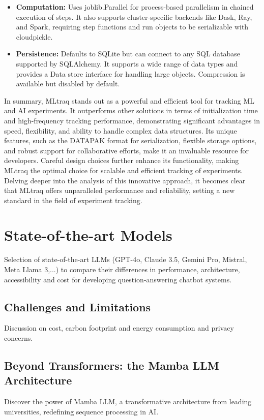 \begin{itemize}
    \item \textbf{Computation:} Uses joblib.Parallel for process-based parallelism in chained execution of steps. It also supports cluster-specific backends like Dask, Ray, and Spark, requiring step functions and run objects to be serializable with cloudpickle.
    \item \textbf{Persistence:} Defaults to SQLite but can connect to any SQL database supported by SQLAlchemy. It supports a wide range of data types and provides a Data store interface for handling large objects. Compression is available but disabled by default.
\end{itemize}

In summary, MLtraq stands out as a powerful and efficient tool for tracking ML and AI experiments. It outperforms other solutions in terms of initialization time and high-frequency tracking performance, demonstrating significant advantages in speed, flexibility, and ability to handle complex data structures. Its unique features, such as the DATAPAK format for serialization, flexible storage options, and robust support for collaborative efforts, make it an invaluable resource for developers. Careful design choices further enhance its functionality, making MLtraq the optimal choice for scalable and efficient tracking of experiments. Delving deeper into the analysis of this innovative approach, it becomes clear that MLtraq offers unparalleled performance and reliability, setting a new standard in the field of experiment tracking.

\newpage

\section{State-of-the-art Models}
Selection of state-of-the-art LLMs (GPT-4o, Claude 3.5, Gemini Pro, Mistral, Meta Llama 3,...) to compare their differences in performance, architecture, accessibility and cost for developing question-answering chatbot systems.

\subsection{Challenges and Limitations}
Discussion on cost, carbon footprint and energy consumption and privacy concerns.

\subsection{Beyond Transformers: the Mamba LLM Architecture}
Discover the power of Mamba LLM, a transformative architecture from leading universities, redefining sequence processing in AI.

